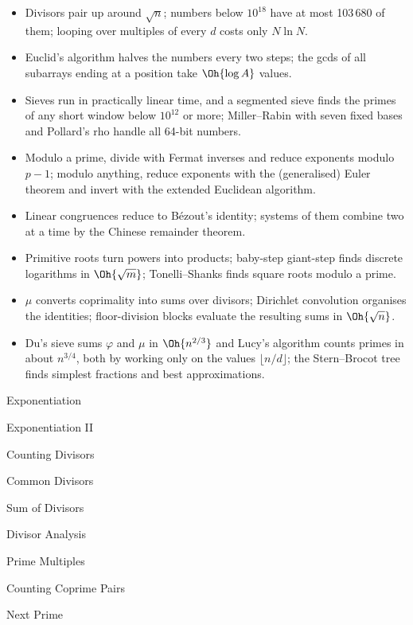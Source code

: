 \begin{summary}
\begin{itemize}
  \item Divisors pair up around $\sqrt n$; numbers below $10^{18}$ have at most 103\,680 of them; looping over multiples of every $d$
        costs only $N \ln N$.
  \item Euclid's algorithm halves the numbers every two steps; the gcds of all subarrays ending at a position take $\Oh{\log A}$ values.
  \item Sieves run in practically linear time, and a segmented sieve finds the primes of any short window below $10^{12}$ or more;
        Miller--Rabin with seven fixed bases and Pollard's rho handle all 64-bit numbers.
  \item Modulo a prime, divide with Fermat inverses and reduce exponents modulo $p - 1$; modulo anything, reduce exponents with the
        (generalised) Euler theorem and invert with the extended Euclidean algorithm.
  \item Linear congruences reduce to B\'ezout's identity; systems of them combine two at a time by the Chinese remainder theorem.
  \item Primitive roots turn powers into products; baby-step giant-step finds discrete logarithms in $\Oh{\sqrt m}$; Tonelli--Shanks
        finds square roots modulo a prime.
  \item $\mu$ converts coprimality into sums over divisors; Dirichlet convolution organises the identities; floor-division blocks
        evaluate the resulting sums in $\Oh{\sqrt n}$.
  \item Du's sieve sums $\varphi$ and $\mu$ in $\Oh{n^{2/3}}$ and Lucy's algorithm counts primes in about $n^{3/4}$, both by working
        only on the values $\lfloor n/d \rfloor$; the Stern--Brocot tree finds simplest fractions and best approximations.
\end{itemize}
\end{summary}

\begin{practice}
\begin{pplist}
  \item Exponentiation
  \item Exponentiation II
  \item Counting Divisors
  \item Common Divisors
  \item Sum of Divisors
  \item Divisor Analysis
  \item Prime Multiples
  \item Counting Coprime Pairs
  \item Next Prime
\end{pplist}
\end{practice}
